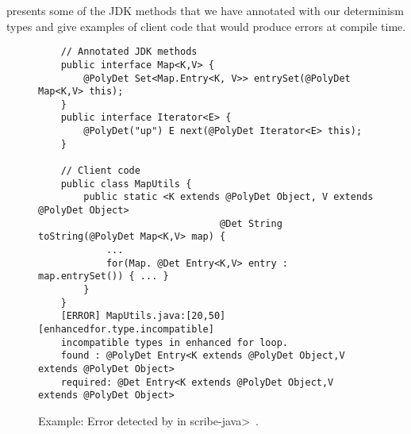  presents some of the JDK methods that we have annotated with our determinism types and give examples of
client code that would produce errors at compile time.
%    

\begin{figure}
    \begin{verbatim}
    // Annotated JDK methods
    public interface Map<K,V> {
        @PolyDet Set<Map.Entry<K, V>> entrySet(@PolyDet Map<K,V> this);
    }
    public interface Iterator<E> {
        @PolyDet("up") E next(@PolyDet Iterator<E> this);
    }
    
    // Client code
    public class MapUtils {
        public static <K extends @PolyDet Object, V extends @PolyDet Object> 
                                @Det String toString(@PolyDet Map<K,V> map) {
            ...
            for(Map. @Det Entry<K,V> entry : map.entrySet()) { ... }
        }
    }
    [ERROR] MapUtils.java:[20,50] [enhancedfor.type.incompatible] 
    incompatible types in enhanced for loop.
    found : @PolyDet Entry<K extends @PolyDet Object,V extends @PolyDet Object>
    required: @Det Entry<K extends @PolyDet Object,V extends @PolyDet Object>
    \end{verbatim}
    \caption{Example: Error detected by \theDeterminismChecker in \<scribe-java>~\cite{nondex}.}
    \label{code-determinism}
\end{figure}

